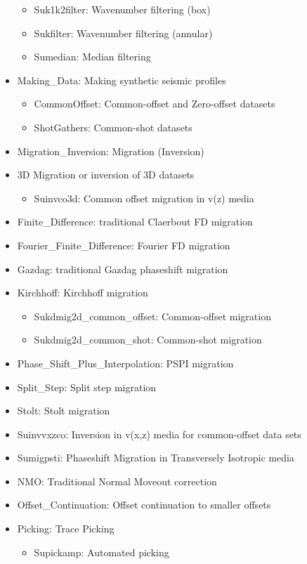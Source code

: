 \begin{itemize}
\begin{itemize}
	\item Suk1k2filter: Wavenumber filtering (box)
	\item Sukfilter:  Wavenumber filtering (annular)
	\item Sumedian:  Median filtering
	\end{itemize}
\item Making\_Data:  Making synthetic seismic profiles
	\begin{itemize}
	\item CommonOffset: Common-offset and Zero-offset datasets
	\item ShotGathers: Common-shot datasets
	\end{itemize}
\item Migration\_Inversion:   Migration (Inversion)
	\item 3D  Migration or inversion of 3D datasets
		\begin{itemize}
		\item Suinvco3d:   Common offset migration in v(z) media
		\end{itemize}
	\item Finite\_Difference:   traditional Claerbout FD migration 
	\item Fourier\_Finite\_Difference: Fourier FD migration
	\item Gazdag: traditional Gazdag phaseshift migration
	\item Kirchhoff:  Kirchhoff migration
		\begin{itemize}
		\item Sukdmig2d\_common\_offset:   Common-offset migration
		\item Sukdmig2d\_common\_shot:   Common-shot migration
		\end{itemize}
	\item Phase\_Shift\_Plus\_Interpolation:   PSPI migration
	\item Split\_Step:  Split step migration
	\item Stolt:  Stolt migration
	\item Suinvvxzco: Inversion in v(x,z) media for common-offset data sets
	\item Sumigpsti:  Phaseshift Migration in Transversely Isotropic media
\item NMO: Traditional Normal Moveout correction
\item Offset\_Continuation:  Offset continuation to smaller offsets
\item Picking: Trace Picking
	\begin{itemize}
	\item Supickamp:   Automated picking

\end{itemize}
\end{itemize}
